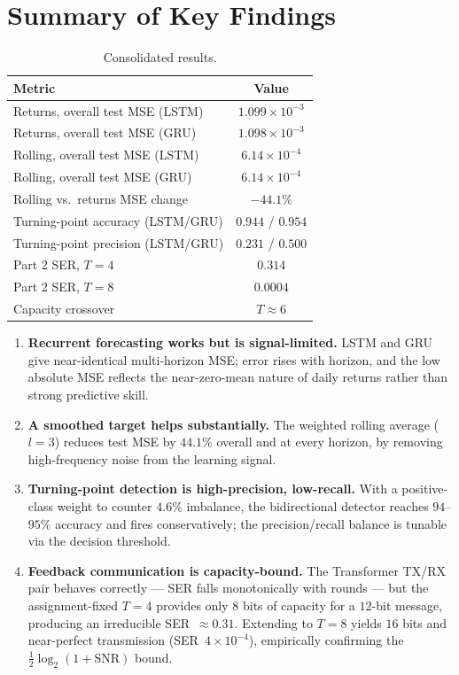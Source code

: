\documentclass[10pt,twocolumn]{article}
\begin{document}
\section{Summary of Key Findings}
\begin{table}[t]
\centering
\caption{Consolidated results.}
\label{tab:summary}
\begin{tabular}{lc}
\toprule
Metric & Value \\
\midrule
Returns, overall test MSE (LSTM)      & $1.099\times10^{-3}$ \\
Returns, overall test MSE (GRU)       & $1.098\times10^{-3}$ \\
Rolling, overall test MSE (LSTM)      & $6.14\times10^{-4}$ \\
Rolling, overall test MSE (GRU)       & $6.14\times10^{-4}$ \\
Rolling vs.\ returns MSE change       & $-44.1\%$ \\
Turning-point accuracy (LSTM/GRU)     & $0.944$ / $0.954$ \\
Turning-point precision (LSTM/GRU)    & $0.231$ / $0.500$ \\
Part 2 SER, $T{=}4$                   & $0.314$ \\
Part 2 SER, $T{=}8$                   & $0.0004$ \\
Capacity crossover                    & $T\approx6$ \\
\bottomrule
\end{tabular}
\end{table}

\begin{enumerate}[leftmargin=1.4em,itemsep=2pt,topsep=2pt]
  \item \textbf{Recurrent forecasting works but is signal-limited.} LSTM and GRU
  give near-identical multi-horizon MSE; error rises with horizon, and the low
  absolute MSE reflects the near-zero-mean nature of daily returns rather than
  strong predictive skill.
  \item \textbf{A smoothed target helps substantially.} The weighted rolling
  average ($l{=}3$) reduces test MSE by $44.1\%$ overall and at every horizon, by
  removing high-frequency noise from the learning signal.
  \item \textbf{Turning-point detection is high-precision, low-recall.} With a
  positive-class weight to counter $4.6\%$ imbalance, the bidirectional detector
  reaches $94$--$95\%$ accuracy and fires conservatively; the precision/recall
  balance is tunable via the decision threshold.
  \item \textbf{Feedback communication is capacity-bound.} The Transformer TX/RX
  pair behaves correctly --- SER falls monotonically with rounds --- but the
  assignment-fixed $T{=}4$ provides only $8$ bits of capacity for a $12$-bit
  message, producing an irreducible SER~$\approx0.31$. Extending to $T{=}8$
  yields $16$ bits and near-perfect transmission (SER~$4\times10^{-4}$),
  empirically confirming the $\tfrac12\log_2(1+\text{SNR})$ bound.
\end{enumerate}
\end{document}
